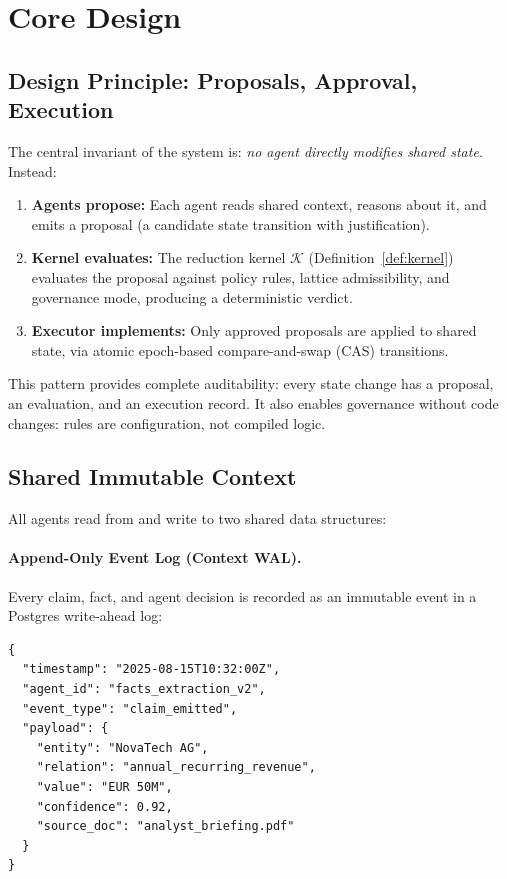 \documentclass[11pt]{article}
\begin{document}
\section{Core Design}

\subsection{Design Principle: Proposals, Approval, Execution}

The central invariant of the system is: \emph{no agent directly modifies shared state}. Instead:

\begin{enumerate}
  \item \textbf{Agents propose:} Each agent reads shared context, reasons about it, and emits a proposal (a candidate state transition with justification).
  \item \textbf{Kernel evaluates:} The reduction kernel $\mathcal{K}$ (Definition~\ref{def:kernel}) evaluates the proposal against policy rules, lattice admissibility, and governance mode, producing a deterministic verdict.
  \item \textbf{Executor implements:} Only approved proposals are applied to shared state, via atomic epoch-based compare-and-swap (CAS) transitions.
\end{enumerate}

This pattern provides complete auditability: every state change has a proposal, an evaluation, and an execution record. It also enables governance without code changes: rules are configuration, not compiled logic.

\subsection{Shared Immutable Context}
\label{sec:shared-context}

All agents read from and write to two shared data structures:

\paragraph{Append-Only Event Log (Context WAL).}
Every claim, fact, and agent decision is recorded as an immutable event in a Postgres write-ahead log:

\begin{lstlisting}
{
  "timestamp": "2025-08-15T10:32:00Z",
  "agent_id": "facts_extraction_v2",
  "event_type": "claim_emitted",
  "payload": {
    "entity": "NovaTech AG",
    "relation": "annual_recurring_revenue",
    "value": "EUR 50M",
    "confidence": 0.92,
    "source_doc": "analyst_briefing.pdf"
  }
}
\end{lstlisting}
\end{document}
